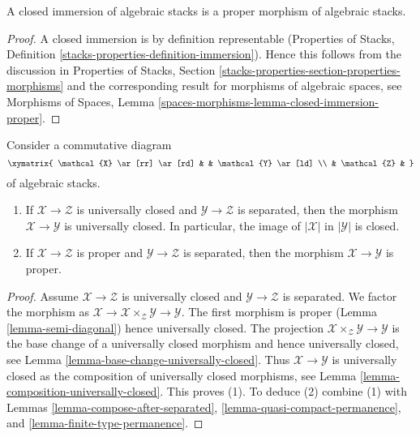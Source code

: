\begin{lemma}
\label{lemma-closed-immersion-proper}
A closed immersion of algebraic stacks is a proper morphism of
algebraic stacks.
\end{lemma}

\begin{proof}
A closed immersion is by definition representable
(Properties of Stacks, Definition
\ref{stacks-properties-definition-immersion}).
Hence this follows from the discussion in
Properties of Stacks, Section
\ref{stacks-properties-section-properties-morphisms}
and the corresponding result for morphisms of algebraic spaces, see
Morphisms of Spaces, Lemma
\ref{spaces-morphisms-lemma-closed-immersion-proper}.
\end{proof}

\begin{lemma}
\label{lemma-universally-closed-permanence}
Consider a commutative diagram
$$
\xymatrix{
\mathcal{X} \ar[rr] \ar[rd] & &
\mathcal{Y} \ar[ld] \\
& \mathcal{Z} &
}
$$
of algebraic stacks.
\begin{enumerate}
\item If $\mathcal{X} \to \mathcal{Z}$ is universally closed and
$\mathcal{Y} \to \mathcal{Z}$ is separated,
then the morphism $\mathcal{X} \to \mathcal{Y}$ is universally closed.
In particular, the image of $|\mathcal{X}|$ in $|\mathcal{Y}|$ is closed.
\item If $\mathcal{X} \to \mathcal{Z}$ is proper and
$\mathcal{Y} \to \mathcal{Z}$ is separated, then
the morphism $\mathcal{X} \to \mathcal{Y}$ is proper.
\end{enumerate}
\end{lemma}

\begin{proof}
Assume $\mathcal{X} \to \mathcal{Z}$ is universally closed and
$\mathcal{Y} \to \mathcal{Z}$ is separated.
We factor the morphism as
$\mathcal{X} \to \mathcal{X} \times_\mathcal{Z} \mathcal{Y} \to \mathcal{Y}$.
The first morphism is proper (Lemma \ref{lemma-semi-diagonal})
hence universally closed.
The projection $\mathcal{X} \times_\mathcal{Z} \mathcal{Y} \to \mathcal{Y}$
is the base change of a universally closed morphism and hence
universally closed, see
Lemma \ref{lemma-base-change-universally-closed}.
Thus $\mathcal{X} \to \mathcal{Y}$ is universally closed as the composition
of universally closed morphisms, see
Lemma \ref{lemma-composition-universally-closed}.
This proves (1). To deduce (2) combine (1) with
Lemmas \ref{lemma-compose-after-separated},
\ref{lemma-quasi-compact-permanence}, and
\ref{lemma-finite-type-permanence}.
\end{proof}

